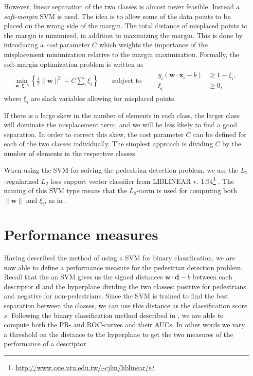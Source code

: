 \documentclass[thesis.tex]{subfiles}
\def\x{\mathbf{x}}
\def\d{\mathbf{d}}
\def\w{\mathbf{w}}
\begin{document}
However, linear separation of the two classes is almost never feasible. Instead a \emph{soft-margin} SVM is used. The idea is to allow some of the data points to be placed on the wrong side of the margin. The total distance of misplaced points to the margin is minimized, in addition to maximizing the margin. This is done by introducing a \emph{cost} parameter $C$ which weights the importance of the misplacement minimization relative to the margin maximization. Formally, the soft-margin optimization problem is written as
%
\begin{align}
\label{eq:svmDefinition}
\min_{\w,\boldsymbol{\xi},b} \left\{ \frac12 \| \w \|^2 + C \sum_i \xi_i \right\} \qquad \text{subject to} \qquad \begin{aligned} y_i (\w \cdot \x_i - b) &\geq 1 - \xi_i, \\ \xi_i &\geq 0, \end{aligned}
\end{align}
%
where $\xi_i$ are slack variables allowing for misplaced points.

If there is a large skew in the number of elements in each class, the larger class will dominate the misplacement term, and we will be less likely to find a good separation. In order to correct this skew, the cost parameter $C$ can be defined for each of the two classes individually. The simplest approach is dividing $C$ by the number of elements in the respective classes.

When using the SVM for solving the pedestrian detection problem, we use the $L_2$-regularized $L_2$ loss support vector classifier from LIBLINEAR v. 1.94\footnote{\url{http://www.csie.ntu.edu.tw/~cjlin/liblinear/}} \cite{fan2008liblinear}. The naming of this SVM type means that the $L_2$-norm is used for computing both $\| \w \|$ and $\xi_i$, as in .

\section{Performance measures}

Having described the method of using a SVM for binary classification, we are now able to define a performance measure for the pedestrian detection problem. Recall that the an SVM gives us the signed distances $\w \cdot \d - b$ between each descriptor $\d$ and the hyperplane dividing the two classes: positive for pedestrians and negative for non-pedestrians. Since the SVM is trained to find the best separation between the classes, we can use this distance as the classification score $s$. Following the binary classification method described in , we are able to compute both the PR- and ROC-curves and their AUCs. In other words we vary a threshold on the distance to the hyperplane to get the two measures of the performance of a descriptor.
\end{document}
